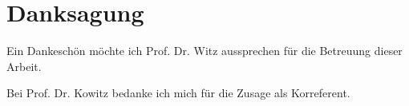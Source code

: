 
\chapter*{Danksagung}
\label{sec:acknowledgements}
\noindent
Ein Dankeschön möchte ich Prof. Dr. Witz
aussprechen für die Betreuung dieser Arbeit.

Bei Prof. Dr. Kowitz bedanke ich mich für die Zusage als Korreferent.

\Blindtext
